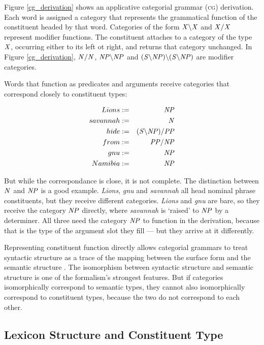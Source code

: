 \documentclass[11pt,twoside,final]{ahudson-harvard}
\newcommand{\cf}[1]{\mbox{$\it{#1}$}}   %
\newcommand{\assign}{:=\xspace}
\newcommand{\cg}{\textsc{cg}\xspace}
\begin{document}
Figure \ref{cg_derivation} shows an applicative categorial grammar (\cg) derivation. Each word is assigned a category that represents the grammatical function of the constituent headed by that word. Categories of the form \cf{X\bs X} and \cf{X/X} represent modifier functions. The constituent attaches to a category of the type \cf{X}, occurring either to its left ot right, and returns that category unchanged. In Figure \ref{cg_derivation}, \cf{N/N}, \cf{NP\bs NP} and \cf{(S\bs NP)\bs (S\bs NP)} are modifier categories.

Words that function as predicates and arguments receive categories that correspond closely to constituent types:

\begin{eqnarray}
Lions    & \assign & \cf{NP}\nonumber \\
savannah & \assign & \cf{N}\nonumber \\
hide     & \assign & \cf{(S\bs NP)/PP}\nonumber \\
from     & \assign & \cf{PP/NP}\nonumber \\
gnu      & \assign & \cf{NP}\nonumber \\
Namibia    & \assign & \cf{NP}\nonumber \\
\end{eqnarray}

But while the correspondance is close, it is not complete. The distinction between \cf{N} and \cf{NP} is a good example. \emph{Lions}, \emph{gnu} and \emph{savannah} all head nominal phrase constituents, but they receive different categories. \emph{Lions} and \emph{gnu} are bare, so they receive the category \cf{NP} directly, where \emph{savannah} is `raised' to \cf{NP} by a determiner. All three need the category \cf{NP} to function in the derivation, because that is the type of the argument slot they fill --- but they arrive at it differently.

Representing constituent function directly allows categorial grammars to treat syntactic structure as a trace of the mapping between the surface form and the semantic structure \citep{steedman:2000}. The isomorphism between syntactic structure and semantic structure is one of the formalism's strongest features. But if categories isomorphically correspond to semantic types, they cannot also isomorphically correspond to constituent types,  because the two do not correspond to each other.

\subsection{Lexicon Structure and Constituent Type}
\end{document}

